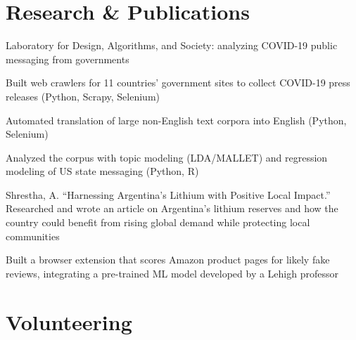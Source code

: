 \documentclass[]{deedy-resume-openfont}
\begin{document}
\hfill
%
%
\begin{minipage}[t]{0.66\textwidth}


\section{Research \& Publications}

Laboratory for Design, Algorithms, and Society: analyzing COVID-19 public messaging from governments
\vspace{\topsep}
\begin{tightemize}
\item Built web crawlers for 11 countries' government sites to collect COVID-19 press releases (Python, Scrapy, Selenium)
\item Automated translation of large non-English text corpora into English (Python, Selenium)
\item Analyzed the corpus with topic modeling (LDA/MALLET) and regression modeling of US state messaging (Python, R)
\end{tightemize}
\sectionsep

Shrestha, A. ``Harnessing Argentina's Lithium with Positive Local Impact.'' Researched and wrote an article on Argentina's lithium reserves and how the country could benefit from rising global demand while protecting local communities
\sectionsep

Built a browser extension that scores Amazon product pages for likely fake reviews, integrating a pre-trained ML model developed by a Lehigh professor
\sectionsep


\section{Volunteering}


\end{minipage}
\end{document}
